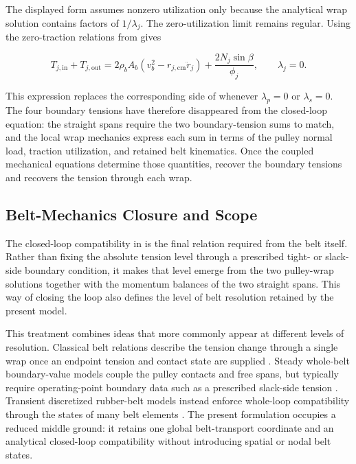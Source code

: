 \documentclass[11pt]{report}
\numberwithin{equation}{section}
\begin{document}
The displayed form assumes nonzero utilization only because the analytical
wrap solution contains factors of $1/\lambda_j$. The zero-utilization limit
remains regular. Using the zero-traction relations from
gives

\begin{equation}
    T_{j,\mathrm{in}}+T_{j,\mathrm{out}}
    =
    2\rho_bA_b
    \left(
        v_b^2-r_{j,\mathrm{cm}}\ddot r_j
    \right)
    +
    \frac{2N_j\sin\beta}{\phi_j},
    \qquad \lambda_j=0.
    \label{eq:generic_wrap_boundary_tension_sum_zero_lambda}
\end{equation}

This expression replaces the corresponding side of
 whenever $\lambda_p=0$ or
$\lambda_s=0$. The four boundary tensions have therefore disappeared from the
closed-loop equation: the straight spans require the two boundary-tension sums
to match, and the local wrap mechanics express each sum in terms of the pulley
normal load, traction utilization, and retained belt kinematics. Once the
coupled mechanical equations determine those quantities,
 recover the
boundary tensions and  recovers the tension
through each wrap.

\subsection{Belt-Mechanics Closure and Scope}
\label{sec:belt_mechanics_synthesis}

The closed-loop compatibility in
 is the final relation required
from the belt itself. Rather than fixing the absolute tension level through a
prescribed tight- or slack-side boundary condition, it makes that level
emerge from the two pulley-wrap solutions together with the momentum balances
of the two straight spans. This way of closing the loop also defines the level
of belt resolution retained by the present model.

This treatment combines ideas that more commonly appear at different levels
of resolution. Classical belt relations describe the tension change through a
single wrap once an endpoint tension and contact state are supplied
\citep{Gerbert1996}. Steady whole-belt boundary-value models couple the pulley
contacts and free spans, but typically require operating-point boundary data
such as a prescribed slack-side tension \citep{KongParker2006,Messick2018}.
Transient discretized rubber-belt models instead enforce whole-loop
compatibility through the states of many belt elements
\citep{JulioPlante2011,Ballew2015}. The present formulation occupies a reduced
middle ground: it retains one global belt-transport coordinate and an
analytical closed-loop compatibility without introducing spatial or nodal belt
states.
\end{document}
